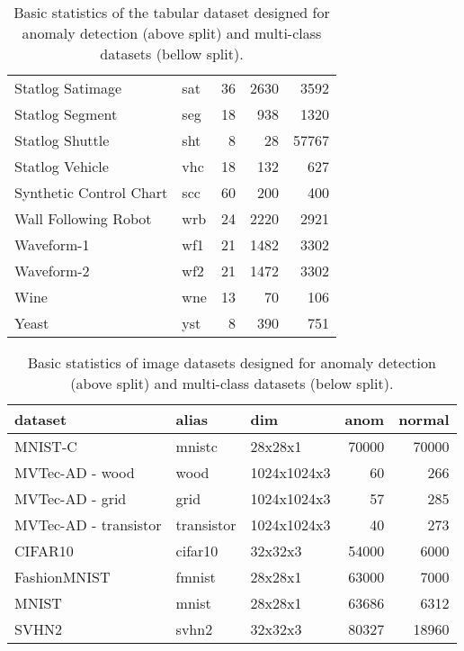 \begin{table}
\begin{tabular}{llrrr}
Statlog Satimage & sat & 36 & 2630 & 3592  \\
Statlog Segment & seg & 18 & 938 & 1320  \\
Statlog Shuttle & sht & 8 & 28 & 57767  \\
Statlog Vehicle & vhc & 18 & 132 & 627  \\
Synthetic Control Chart & scc & 60 & 200 & 400  \\
Wall Following Robot & wrb & 24 & 2220 & 2921  \\
Waveform-1 & wf1 & 21 & 1482 & 3302  \\
Waveform-2 & wf2 & 21 & 1472 & 3302  \\
Wine & wne & 13 & 70 & 106  \\
Yeast & yst & 8 & 390 & 751   \\\bottomrule
\end{tabular}
\vspace*{0.15cm}
\caption{Basic statistics of the tabular dataset designed for anomaly detection  (above split) and multi-class datasets  (bellow split).}
\label{tab:tabular_datasets}
\end{table}

\begin{table}
    \centering
    \tabcolsep=0.1cm
    \begin{tabular}{lllrr}
    \toprule
    \textbf{dataset} & \textbf{alias} & \textbf{dim} & \textbf{anom} & \textbf{normal} \\
    \midrule
    MNIST-C & mnistc & 28x28x1 & 70000 & 70000 \\
    MVTec-AD - wood & wood & 1024x1024x3 & 60 & 266 \\
    MVTec-AD - grid & grid & 1024x1024x3 & 57 & 285 \\
    MVTec-AD - transistor & transistor & 1024x1024x3 & 40 & 273 \\
    \midrule
    CIFAR10 & cifar10 & 32x32x3 & 54000 & 6000  \\
    FashionMNIST & fmnist & 28x28x1 & 63000 & 7000   \\
    MNIST & mnist & 28x28x1 & 63686 & 6312  \\
    SVHN2 & svhn2 & 32x32x3 & 80327 & 18960  \\\bottomrule
    \end{tabular}
    \vspace*{0.15cm}
    \caption{Basic statistics of image datasets designed for anomaly detection (above split) and multi-class datasets (below split).}
    \label{tab:image_datasets}
\end{table}

